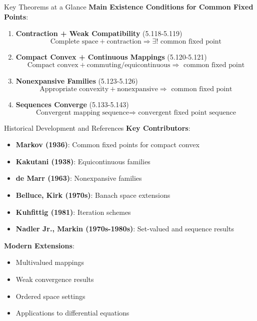 \documentclass[aspectratio=169,10pt]{beamer}
\begin{document}
\begin{frame}{Key Theorems at a Glance}
    \textbf{Main Existence Conditions for Common Fixed Points}:

    \begin{enumerate}
        \item \textbf{Contraction + Weak Compatibility} (5.118-5.119)
        \[
            \text{Complete space} + \text{contraction} \Rightarrow \exists! \text{ common fixed point}
        \]

        \item \textbf{Compact Convex + Continuous Mappings} (5.120-5.121)
        \[
            \text{Compact convex} + \text{commuting/equicontinuous} \Rightarrow \text{ common fixed point}
        \]

        \item \textbf{Nonexpansive Families} (5.123-5.126)
        \[
            \text{Appropriate convexity} + \text{nonexpansive} \Rightarrow \text{ common fixed point}
        \]

        \item \textbf{Sequences Converge} (5.133-5.143)
        \[
            \text{Convergent mapping sequence} \Rightarrow \text{ convergent fixed point sequence}
        \]
    \end{enumerate}
\end{frame}

\begin{frame}{Historical Development and References}
    \textbf{Key Contributors}:
    \begin{itemize}
        \item \textbf{Markov (1936)}: Common fixed points for compact convex
        \item \textbf{Kakutani (1938)}: Equicontinuous families
        \item \textbf{de Marr (1963)}: Nonexpansive families
        \item \textbf{Belluce, Kirk (1970s)}: Banach space extensions
        \item \textbf{Kuhfittig (1981)}: Iteration schemes
        \item \textbf{Nadler Jr., Markin (1970s-1980s)}: Set-valued and sequence results
    \end{itemize}

    \medskip

    \textbf{Modern Extensions}:
    \begin{itemize}
        \item Multivalued mappings
        \item Weak convergence results
        \item Ordered space settings
        \item Applications to differential equations
    \end{itemize}
\end{frame}
\end{document}
